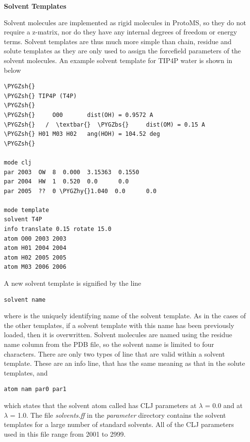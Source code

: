 \documentclass[letterpaper,10pt,english]{sphinxmanual}
\def\PYGZbs{\char`\\}
\def\PYGZsh{\char`\#}
\def\PYGZhy{\char`\-}
\begin{document}
\textbf{Solvent Templates}

Solvent molecules are implemented as rigid molecules in ProtoMS, so they do not require a z-matrix, nor do they have any internal degrees of freedom or energy terms. Solvent templates are thus much more simple than chain, residue and solute templates as they are only used to assign the forcefield parameters of the solvent molecules. An example solvent template for TIP4P water is shown in below

\begin{Verbatim}[frame=single,commandchars=\\\{\}]
\PYGZsh{}
\PYGZsh{} TIP4P (T4P)
\PYGZsh{}
\PYGZsh{}     O00       dist(OH) = 0.9572 A
\PYGZsh{}   /  \textbar{}  \PYGZbs{}     dist(OM) = 0.15 A
\PYGZsh{} H01 M03 H02   ang(HOH) = 104.52 deg
\PYGZsh{}

mode clj
par 2003  OW  8  0.000  3.15363  0.1550
par 2004  HW  1  0.520  0.0      0.0
par 2005  ??  0 \PYGZhy{}1.040  0.0      0.0

mode template
solvent T4P
info translate 0.15 rotate 15.0
atom O00 2003 2003
atom H01 2004 2004
atom H02 2005 2005
atom M03 2006 2006
\end{Verbatim}

A new solvent template is signified by the line

\begin{Verbatim}[frame=single,commandchars=\\\{\}]
solvent name
\end{Verbatim}

where  is the uniquely identifying name of the solvent template. As in the cases of the other templates, if a solvent template with this name has been previously loaded, then it is overwritten. Solvent molecules are named using the residue name column from the PDB file, so the solvent name is limited to four characters. There are only two types of line that are valid within a solvent template. These are an info line, that has the same meaning as that in the solute templates, and

\begin{Verbatim}[frame=single,commandchars=\\\{\}]
atom nam par0 par1
\end{Verbatim}

which states that the solvent atom called  has CLJ parameters  at \(\lambda\) = 0.0 and  at \(\lambda\) = 1.0. The file \emph{solvents.ff} in the \emph{parameter} directory contains the solvent templates for a large number of standard solvents. All of the CLJ parameters used in this file range from 2001 to 2999.
\end{document}

